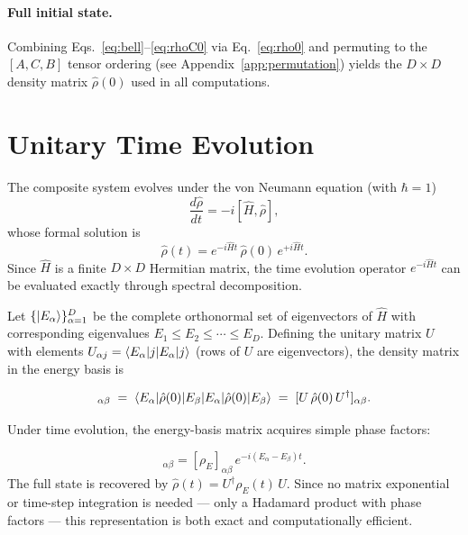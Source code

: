 \documentclass[12pt,a4paper]{article}
\newcommand{\Ham}{\hat{H}}
\newcommand{\rhohat}{\hat{\rho}}
\begin{document}
\paragraph{Full initial state.}
Combining Eqs.~\eqref{eq:bell}--\eqref{eq:rhoC0} via Eq.~\eqref{eq:rho0} and
permuting to the $[A,C,B]$ tensor ordering (see
Appendix~\ref{app:permutation}) yields the $D\times D$ density matrix
$\rhohat(0)$ used in all computations.

\section{Unitary Time Evolution}
\label{sec:evolution}

The composite system evolves under the von Neumann equation (with $\hbar=1$)
\begin{equation}
  \frac{d\rhohat}{dt} = -i[\Ham,\rhohat],
  \label{eq:vonNeumann}
\end{equation}
whose formal solution is
\begin{equation}
  \rhohat(t) = e^{-i\Ham t}\,\rhohat(0)\,e^{+i\Ham t}.
  \label{eq:rho_t}
\end{equation}
Since $\Ham$ is a finite $D\times D$ Hermitian matrix, the time evolution
operator $e^{-i\Ham t}$ can be evaluated exactly through spectral decomposition.

Let $\{\ket{E_\alpha}\}_{\alpha=1}^D$ be the complete orthonormal set of
eigenvectors of $\Ham$ with corresponding eigenvalues $E_1\leq E_2\leq\cdots\leq E_D$.
Defining the unitary matrix $U$ with elements $U_{\alpha j} = \braket{E_\alpha|j}$
(rows of $U$ are eigenvectors), the density matrix in the energy basis is

\begin{equation}
  [\rho_E]_{\alpha\beta} \;=\; \braket{E_\alpha|\rhohat(0)|E_\beta}
  \;=\; [U\,\rhohat(0)\,U^\dagger]_{\alpha\beta}.
  \label{eq:rhoE}
\end{equation}

Under time evolution, the energy-basis matrix acquires simple phase factors:

\begin{equation}
  [\rho_E(t)]_{\alpha\beta} = [\rho_E]_{\alpha\beta}\,e^{-i(E_\alpha-E_\beta)t}.
  \label{eq:rhoE_t}
\end{equation}
The full state is recovered by $\rhohat(t) = U^\dagger\rho_E(t)\,U$.  Since no
matrix exponential or time-step integration is needed — only a Hadamard product
with phase factors — this representation is both exact and computationally
efficient.
\end{document}
